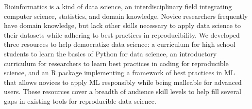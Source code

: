 Bioinformatics is a kind of data science, an interdisciplinary field integrating
computer science, statistics, and domain knowledge.
Novice researchers frequently have domain knowledge, but lack other skills necessary to
apply data science to their datasets while adhering to best practices in
reproducibility.
We developed three resources to help democratize data science:
a curriculum for high school students to learn the basics of Python for data science,
an introductory curriculum for researchers to learn best practices in coding for
reproducible science,
and an R package implementing a framework of best practices in ML that allows
novices to apply ML responsibly while being malleable for advanced users.
These resources cover a breadth of audience skill levels to help fill several
gaps in existing tools for reproducible data science.